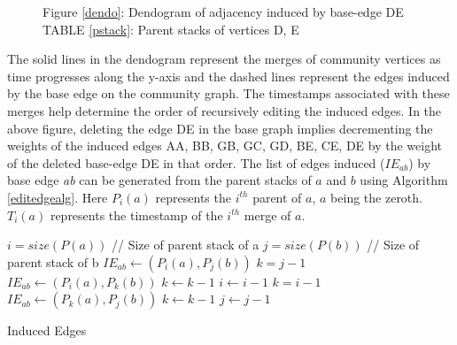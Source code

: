 \documentclass[conference]{IEEEtran}
\begin{document}
\begin{itemize}
\begin{figure}
\begin{floatrow}
\hspace{1cm}
\end{floatrow}
\vspace{0.3cm}
Figure \ref{dendo}: Dendogram of adjacency induced by base-edge DE\\
\flushleft TABLE \ref{pstack}: Parent stacks of vertices D, E
\vspace{-0.5cm}
\end{figure}
The solid lines in the dendogram represent the merges of community vertices 
as time progresses along the y-axis and the dashed lines represent the edges 
induced by the base edge on the community graph. The timestamps associated with 
these merges help determine the order of recursively editing the induced 
edges. In the above figure, deleting the edge DE in the base graph implies 
decrementing the weights of the induced edges AA, BB, GB, GC, GD, BE, CE, DE by 
the weight of the deleted base-edge DE in that order. The list of edges induced 
($IE_{ab}$) by base edge \emph{ab} can be generated from the parent stacks of 
$a$ and $b$ using Algorithm \ref{editedgealg}. Here $P_i(a)$ represents the 
$i^{th}$ parent of $a$, $a$ being the zeroth. $T_i(a)$ represents the timestamp 
of the $i^{th}$ merge of $a$.
\begin{algorithm}
\begin{algorithmic}
\State $i = size(P(a))$ //{ Size of parent stack of a}
\State $j = size(P(b))$ //{ Size of parent stack of b}
  \State $IE_{ab} \gets (P_i(a), P_j(b))$
    \State $k = j-1$
      \State $IE_{ab} \gets (P_i(a), P_k(b))$
      \State $k \gets k-1$
    \EndWhile
    \State $i \gets i-1$
  \Else
    \State $k = i-1$
      \State $IE_{ab} \gets (P_k(a), P_j(b))$
      \State $k \gets k-1$
    \EndWhile
    \State $j \gets j-1$
  \EndIf
\EndWhile
\end{algorithmic}
\caption{Induced Edges}
\label{editedgealg}
\end{algorithm}


\end{itemize}
\end{document}
